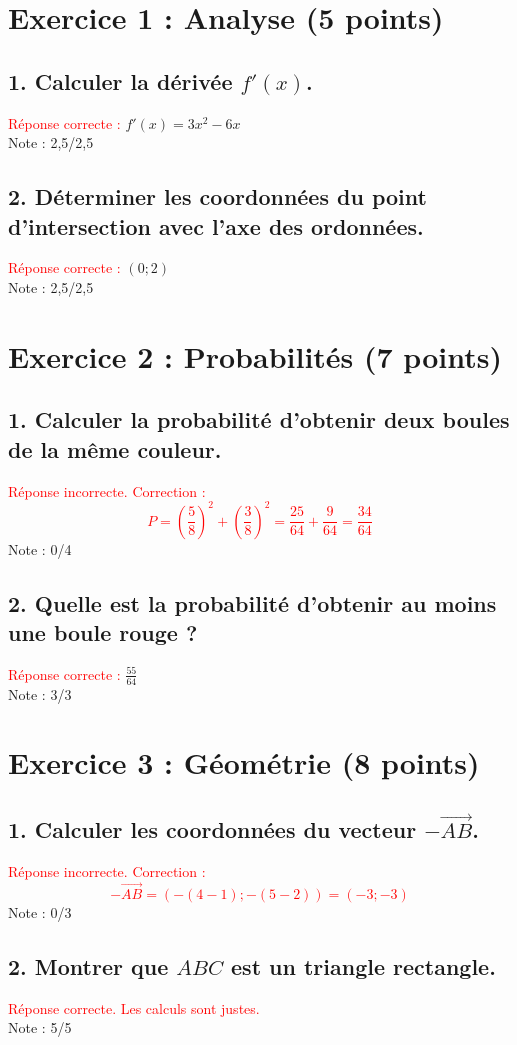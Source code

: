 \documentclass{article}
\begin{document}
\section*{Exercice 1 : Analyse (5 points)}
\subsection*{1. Calculer la dérivée $f'(x)$.}
\textcolor{red}{Réponse correcte :} $f'(x) = 3x^2 - 6x$ \\
Note : 2,5/2,5

\subsection*{2. Déterminer les coordonnées du point d'intersection avec l'axe des ordonnées.}
\textcolor{red}{Réponse correcte :} $(0; 2)$ \\
Note : 2,5/2,5

\section*{Exercice 2 : Probabilités (7 points)}
\subsection*{1. Calculer la probabilité d'obtenir deux boules de la même couleur.}
\textcolor{red}{Réponse incorrecte. Correction : 
\[
P = \left(\frac{5}{8}\right)^2 + \left(\frac{3}{8}\right)^2 = \frac{25}{64} + \frac{9}{64} = \frac{34}{64}
\]}
Note : 0/4

\subsection*{2. Quelle est la probabilité d'obtenir au moins une boule rouge ?}
\textcolor{red}{Réponse correcte :} $\frac{55}{64}$ \\
Note : 3/3

\section*{Exercice 3 : Géométrie (8 points)}
\subsection*{1. Calculer les coordonnées du vecteur $-\vec{AB}$.}
\textcolor{red}{Réponse incorrecte. Correction : 
\[
-\vec{AB} = (-(4-1); -(5-2)) = (-3; -3)
\]}
Note : 0/3

\subsection*{2. Montrer que $ABC$ est un triangle rectangle.}
\textcolor{red}{Réponse correcte. Les calculs sont justes.} \\
Note : 5/5
\end{document}
